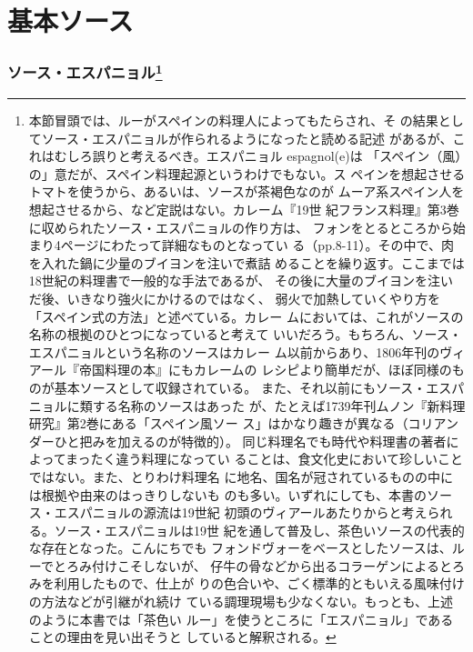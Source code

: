 \hypertarget{grandes-sauces-de-base}{%
\section{基本ソース}\label{grandes-sauces-de-base}}


\begin{recette}
\hypertarget{sauce-espagnole}{%
\subsubsection[ソース・エスパニョル]{\texorpdfstring{ソース・エスパニョル\footnote{本節冒頭では、ルーがスペインの料理人によってもたらされ、そ
  の結果としてソース・エスパニョルが作られるようになったと読める記述
  があるが、これはむしろ誤りと考えるべき。エスパニョル espagnol(e)は
  「スペイン（風）の」意だが、スペイン料理起源というわけでもない。ス
  ペインを想起させるトマトを使うから、あるいは、ソースが茶褐色なのが
  ムーア系スペイン人を想起させるから、など定説はない。カレーム『19世
  紀フランス料理』第3巻に収められたソース・エスパニョルの作り方は、
  フォンをとるところから始まり4ページにわたって詳細なものとなってい
  る（pp.8-11）。その中で、肉を入れた鍋に少量のブイヨンを注いで煮詰
  めることを繰り返す。ここまでは18世紀の料理書で一般的な手法であるが、
  その後に大量のブイヨンを注いだ後、いきなり強火にかけるのではなく、
  弱火で加熱していくやり方を「スペイン式の方法」と述べている。カレー
  ムにおいては、これがソースの名称の根拠のひとつになっていると考えて
  いいだろう。もちろん、ソース・エスパニョルという名称のソースはカレー
  ム以前からあり、1806年刊のヴィアール『帝国料理の本』にもカレームの
  レシピより簡単だが、ほぼ同様のものが基本ソースとして収録されている。
  また、それ以前にもソース・エスパニョルに類する名称のソースはあった
  が、たとえば1739年刊ムノン『新料理研究』第2巻にある「スペイン風ソー
  ス」はかなり趣きが異なる（コリアンダーひと把みを加えるのが特徴的）。
  同じ料理名でも時代や料理書の著者によってまったく違う料理になってい
  ることは、食文化史において珍しいことではない。また、とりわけ料理名
  に地名、国名が冠されているものの中には根拠や由来のはっきりしないも
  のも多い。いずれにしても、本書のソース・エスパニョルの源流は19世紀
  初頭のヴィアールあたりからと考えられる。ソース・エスパニョルは19世
  紀を通して普及し、茶色いソースの代表的な存在となった。こんにちでも
  フォンドヴォーをベースとしたソースは、ルーでとろみ付けこそしないが、
  仔牛の骨などから出るコラーゲンによるとろみを利用したもので、仕上が
  りの色合いや、ごく標準的ともいえる風味付けの方法などが引継がれ続け
  ている調理現場も少なくない。もっとも、上述のように本書では「茶色い
  ルー」を使うところに「エスパニョル」であることの理由を見い出そうと
  していると解釈される。}}{ソース・エスパニョル}}\label{sauce-espagnole}}


\end{recette}
